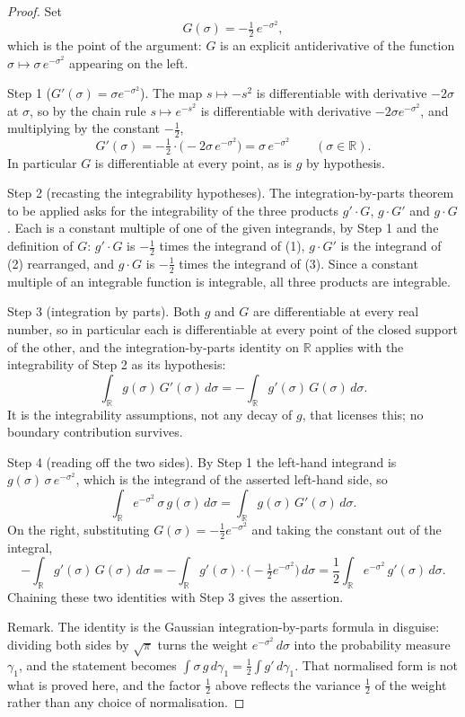 \begin{proof}
Set
\[
  G(\sigma) = -\tfrac{1}{2}\, e^{-\sigma^2} ,
\]
which is the point of the argument: $G$ is an explicit antiderivative of the
function $\sigma \mapsto \sigma\, e^{-\sigma^2}$ appearing on the left.

Step 1 ($G' (\sigma)= \sigma e^{-\sigma^2}$).  The map $s \mapsto -s^2$ is
differentiable with derivative $-2\sigma$ at $\sigma$, so by the chain rule
$s \mapsto e^{-s^2}$ is differentiable with derivative $-2\sigma e^{-\sigma^2}$,
and multiplying by the constant $-\tfrac12$,
\[
  G'(\sigma) = -\tfrac12 \cdot \bigl(-2\sigma\, e^{-\sigma^2}\bigr)
    = \sigma\, e^{-\sigma^2} \qquad (\sigma \in \mathbb{R}).
\]
In particular $G$ is differentiable at every point, as is $g$ by hypothesis.

Step 2 (recasting the integrability hypotheses).  The integration-by-parts
theorem to be applied asks for the integrability of the three products
$g' \cdot G$, $g \cdot G'$ and $g \cdot G$.  Each is a constant multiple of one
of the given integrands, by Step 1 and the definition of $G$: $g' \cdot G$ is
$-\tfrac12$ times the integrand of (1), $g \cdot G'$ is the integrand of (2)
rearranged, and $g \cdot G$ is $-\tfrac12$ times the integrand of (3).  Since a
constant multiple of an integrable function is integrable, all three products
are integrable.

Step 3 (integration by parts).  Both $g$ and $G$ are differentiable at every
real number, so in particular each is differentiable at every point of the
closed support of the other, and the integration-by-parts identity on
$\mathbb{R}$ applies with the integrability of Step 2 as its hypothesis:
\[
  \int_{\mathbb{R}} g(\sigma)\, G'(\sigma)\, d\sigma
    = -\int_{\mathbb{R}} g'(\sigma)\, G(\sigma)\, d\sigma .
\]
It is the integrability assumptions, not any decay of $g$, that licenses this;
no boundary contribution survives.

Step 4 (reading off the two sides).  By Step 1 the left-hand integrand is
$g(\sigma)\,\sigma\, e^{-\sigma^2}$, which is the integrand of the asserted
left-hand side, so
\[
  \int_{\mathbb{R}} e^{-\sigma^2}\,\sigma\, g(\sigma)\, d\sigma
    = \int_{\mathbb{R}} g(\sigma)\, G'(\sigma)\, d\sigma .
\]
On the right, substituting $G(\sigma) = -\tfrac12 e^{-\sigma^2}$ and taking the
constant out of the integral,
\[
  -\int_{\mathbb{R}} g'(\sigma)\, G(\sigma)\, d\sigma
    = -\int_{\mathbb{R}} g'(\sigma)\cdot
        \bigl(-\tfrac12 e^{-\sigma^2}\bigr)\, d\sigma
    = \frac{1}{2}\int_{\mathbb{R}} e^{-\sigma^2}\, g'(\sigma)\, d\sigma .
\]
Chaining these two identities with Step 3 gives the assertion.

Remark.  The identity is the Gaussian integration-by-parts formula in disguise:
dividing both sides by $\sqrt{\pi}$ turns the weight $e^{-\sigma^2}\,d\sigma$
into the probability measure $\gamma_1$, and the statement becomes
$\int \sigma\, g \, d\gamma_1 = \tfrac12 \int g' \, d\gamma_1$.  That normalised
form is not what is proved here, and the factor $\tfrac12$ above reflects the
variance $\tfrac12$ of the weight rather than any choice of normalisation.
\end{proof}
